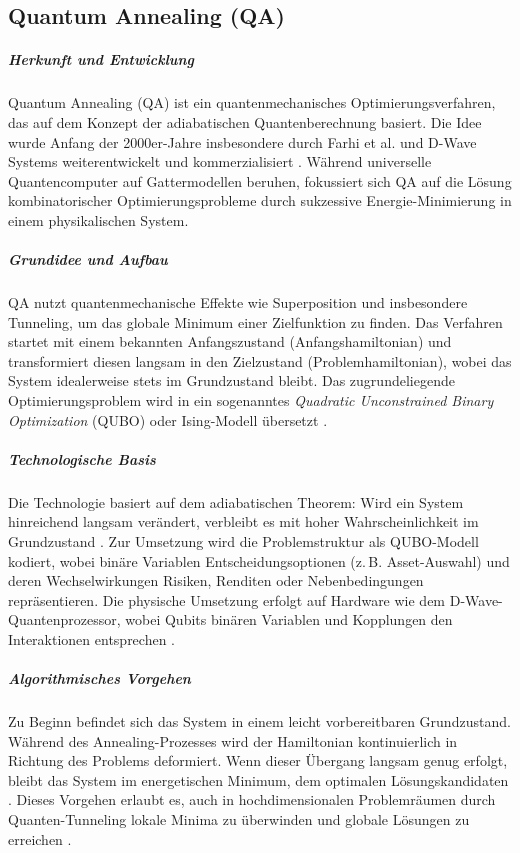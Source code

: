 \subsection{Quantum Annealing (QA)}

\subparagraph{Herkunft und Entwicklung}
Quantum Annealing (QA) ist ein quantenmechanisches Optimierungsverfahren, das auf dem Konzept der adiabatischen Quantenberechnung basiert. Die Idee wurde Anfang der 2000er-Jahre insbesondere durch Farhi et al. und D-Wave Systems weiterentwickelt und kommerzialisiert \cite{orus_quantum_2019}. Während universelle Quantencomputer auf Gattermodellen beruhen, fokussiert sich QA auf die Lösung kombinatorischer Optimierungsprobleme durch sukzessive Energie-Minimierung in einem physikalischen System.

\subparagraph{Grundidee und Aufbau}
QA nutzt quantenmechanische Effekte wie Superposition und insbesondere Tunneling, um das globale Minimum einer Zielfunktion zu finden. Das Verfahren startet mit einem bekannten Anfangszustand (Anfangshamiltonian) und transformiert diesen langsam in den Zielzustand (Problemhamiltonian), wobei das System idealerweise stets im Grundzustand bleibt. Das zugrundeliegende Optimierungsproblem wird in ein sogenanntes \emph{Quadratic Unconstrained Binary Optimization} (QUBO) oder Ising-Modell übersetzt \cite{orus_quantum_2019, mugel_dynamic_2022}.

\subparagraph{Technologische Basis}
Die Technologie basiert auf dem adiabatischen Theorem: Wird ein System hinreichend langsam verändert, verbleibt es mit hoher Wahrscheinlichkeit im Grundzustand \cite{orus_quantum_2019}. Zur Umsetzung wird die Problemstruktur als QUBO-Modell kodiert, wobei binäre Variablen Entscheidungsoptionen (z.\,B. Asset-Auswahl) und deren Wechselwirkungen Risiken, Renditen oder Nebenbedingungen repräsentieren. Die physische Umsetzung erfolgt auf Hardware wie dem D-Wave-Quantenprozessor, wobei Qubits binären Variablen und Kopplungen den Interaktionen entsprechen \cite{mugel_dynamic_2022}.

\subparagraph{Algorithmisches Vorgehen}
Zu Beginn befindet sich das System in einem leicht vorbereitbaren Grundzustand. Während des Annealing-Prozesses wird der Hamiltonian kontinuierlich in Richtung des Problems deformiert. Wenn dieser Übergang langsam genug erfolgt, bleibt das System im energetischen Minimum, dem optimalen Lösungskandidaten \cite{orus_quantum_2019}. Dieses Vorgehen erlaubt es, auch in hochdimensionalen Problemräumen durch Quanten-Tunneling lokale Minima zu überwinden und globale Lösungen zu erreichen \cite{mugel_dynamic_2022, Rosenberg 2016}.

